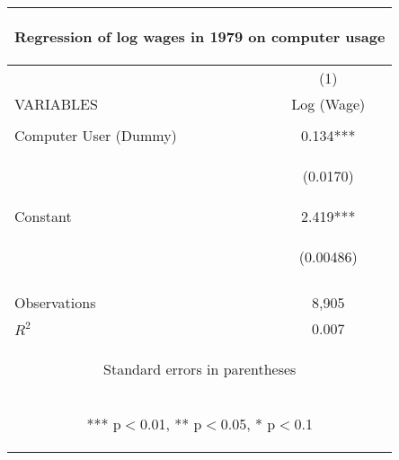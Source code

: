 \begin{center}
\begin{tabular}{lc}
\multicolumn{2}{c}{\begin{large}Regression of log wages in 1979 on computer usage\label{1a1}\end{large}} \\ \hline
 & (1) \\
VARIABLES & Log (Wage) \\ \hline
\vspace{4pt} & \begin{footnotesize}\end{footnotesize} \\
Computer User (Dummy) & 0.134*** \\
\vspace{4pt} & \begin{footnotesize}(0.0170)\end{footnotesize} \\
Constant & 2.419*** \\
 & \begin{footnotesize}(0.00486)\end{footnotesize} \\
\vspace{4pt} & \begin{footnotesize}\end{footnotesize} \\
Observations & 8,905 \\
 $R^2$ & 0.007 \\ \hline
\multicolumn{2}{c}{\begin{footnotesize} Standard errors in parentheses\end{footnotesize}} \\
\multicolumn{2}{c}{\begin{footnotesize} *** p$<$0.01, ** p$<$0.05, * p$<$0.1\end{footnotesize}} \\
\end{tabular}
\end{center}
